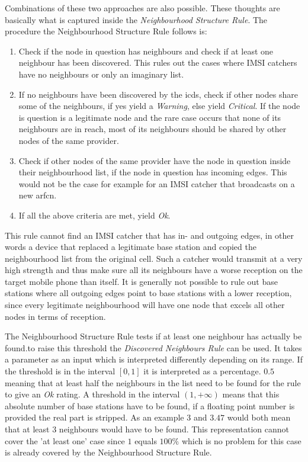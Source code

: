 Combinations of these two approaches are also possible.
These thoughts are basically what is captured inside the \emph{Neighbourhood Structure Rule}.
The procedure the Neighbourhood Structure Rule follows is:
\begin{enumerate}
	\item Check if the node in question has neighbours and check if at least one neighbour has been discovered.
This rules out the cases where IMSI catchers have no neighbours or only an imaginary list.
	\item If no neighbours have been discovered by the \gls{icds}, check if other nodes share some of the neighbours, if yes yield a \emph{Warning}, else yield \emph{Critical}.
If the node is question is a legitimate node and the rare case occurs that none of its neighbours are in reach, most of its neighbours should be shared by other nodes of the same provider.
	\item Check if other nodes of the same provider have the node in question inside their neighbourhood list, \eg if the node in question has incoming edges.
This would not be the case for example for an IMSI catcher that broadcasts on a new \gls{arfcn}.
	\item If all the above criteria are met, yield \emph{Ok}.
\end{enumerate}
This rule cannot find an IMSI catcher that has in- and outgoing edges, in other words a device that replaced a legitimate base station and copied the neighbourhood list from the original cell.
Such a catcher would transmit at a very high strength and thus make sure all its neighbours have a worse reception on the target mobile phone than itself.
It is generally not possible to rule out base stations where all outgoing edges point to base stations with a lower reception, since every legitimate neighbourhood will have one node that excels all other nodes in terms of reception.

The Neighbourhood Structure Rule tests if at least one neighbour has actually be found.to raise this threshold the \emph{Discovered Neighbours Rule} can be used.
It takes a parameter as an input which is interpreted differently depending on its range.
If the threshold is in the interval $[0,1]$ it is interpreted as a percentage.
$0.5$ meaning that at least half the neighbours in the list need to be found for the rule to give an \emph{Ok} rating.
A threshold in the interval $(1,+\infty)$ means that this absolute number of base stations have to be found, if a floating point number is provided the real part is stripped.
As an example $3$ and $3.47$ would both mean that at least $3$ neighbours would have to be found.
This representation cannot cover the 'at least one' case since $1$ equals $100\%$ which is no problem for this case is already covered by the Neighbourhood Structure Rule.

